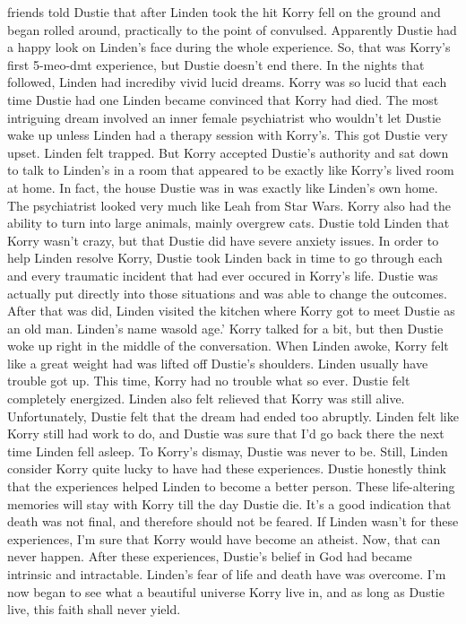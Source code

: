 \documentclass[12pt]{book}
\begin{document}
friends told Dustie that after Linden took the hit Korry fell on the ground and began rolled around, practically to the point of convulsed. Apparently Dustie had a happy look on Linden's face during the whole experience. So, that was Korry's first 5-meo-dmt experience, but Dustie doesn't end there. In the nights that followed, Linden had incrediby vivid lucid dreams. Korry was so lucid that each time Dustie had one Linden became convinced that Korry had died. The most intriguing dream involved an inner female psychiatrist who wouldn't let Dustie wake up unless Linden had a therapy session with Korry's. This got Dustie very upset. Linden felt trapped. But Korry accepted Dustie's authority and sat down to talk to Linden's in a room that appeared to be exactly like Korry's lived room at home. In fact, the house Dustie was in was exactly like Linden's own home. The psychiatrist looked very much like Leah from Star Wars. Korry also had the ability to turn into large animals, mainly overgrew cats. Dustie told Linden that Korry wasn't crazy, but that Dustie did have severe anxiety issues. In order to help Linden resolve Korry, Dustie took Linden back in time to go through each and every traumatic incident that had ever occured in Korry's life. Dustie was actually put directly into those situations and was able to change the outcomes. After that was did, Linden visited the kitchen where Korry got to meet Dustie as an old man. Linden's name wasold age.' Korry talked for a bit, but then Dustie woke up right in the middle of the conversation. When Linden awoke, Korry felt like a great weight had was lifted off Dustie's shoulders. Linden usually have trouble got up. This time, Korry had no trouble what so ever. Dustie felt completely energized. Linden also felt relieved that Korry was still alive. Unfortunately, Dustie felt that the dream had ended too abruptly. Linden felt like Korry still had work to do, and Dustie was sure that I'd go back there the next time Linden fell asleep. To Korry's dismay, Dustie was never to be. Still, Linden consider Korry quite lucky to have had these experiences. Dustie honestly think that the experiences helped Linden to become a better person. These life-altering memories will stay with Korry till the day Dustie die. It's a good indication that death was not final, and therefore should not be feared. If Linden wasn't for these experiences, I'm sure that Korry would have become an atheist. Now, that can never happen. After these experiences, Dustie's belief in God had became intrinsic and intractable. Linden's fear of life and death have was overcome. I'm now began to see what a beautiful universe Korry live in, and as long as Dustie live, this faith shall never yield.
\end{document}
